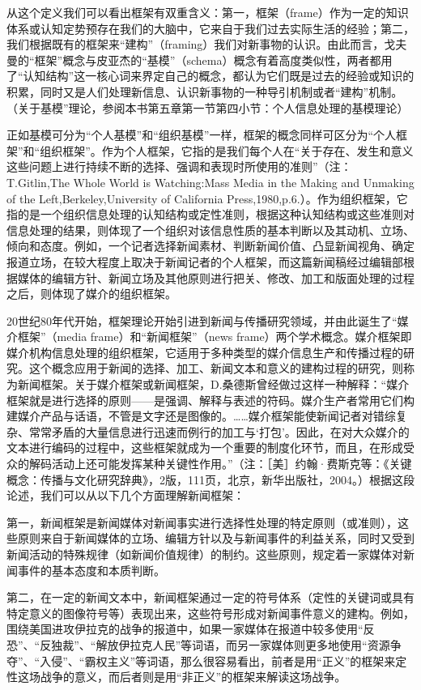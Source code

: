 \documentclass[UTF8,12pt]{ctexart}
\numberwithin{equation}{section} %
\numberwithin{figure}{section}
\numberwithin{table}{section}
\begin{document}
	从这个定义我们可以看出框架有双重含义：第一，框架（frame）作为一定的知识体系或认知定势预存在我们的大脑中，它来自于我们过去实际生活的经验；第二，我们根据既有的框架来“建构”（framing）我们对新事物的认识。由此而言，戈夫曼的“框架”概念与皮亚杰的“基模”（schema）概念有着高度类似性，两者都用了“认知结构”这一核心词来界定自己的概念，都认为它们既是过去的经验或知识的积累，同时又是人们处理新信息、认识新事物的一种导引机制或者“建构”机制。（关于基模”理论，参阅本书第五章第一节第四小节：个人信息处理的基模理论）
	
	正如基模可分为“个人基模”和“组织基模”一样，框架的概念同样可区分为“个人框架”和“组织框架”。作为个人框架，它指的是我们每个人在“关于存在、发生和意义这些问题上进行持续不断的选择、强调和表现时所使用的准则”（注：T.Gitlin,The Whole World is Watching:Mass Media in the Making and Unmaking of the Left,Berkeley,University of California Press,1980,p.6.）。作为组织框架，它指的是一个组织信息处理的认知结构或定性准则，根据这种认知结构或这些准则对信息处理的结果，则体现了一个组织对该信息性质的基本判断以及其动机、立场、倾向和态度。例如，一个记者选择新闻素材、判断新闻价值、凸显新闻视角、确定报道立场，在较大程度上取决于新闻记者的个人框架，而这篇新闻稿经过编辑部根据媒体的编辑方针、新闻立场及其他原则进行把关、修改、加工和版面处理的过程之后，则体现了媒介的组织框架。
	
	20世纪80年代开始，框架理论开始引进到新闻与传播研究领域，并由此诞生了“媒介框架”（media frame）和“新闻框架”（news frame）两个学术概念。媒介框架即媒介机构信息处理的组织框架，它适用于多种类型的媒介信息生产和传播过程的研究。这个概念应用于新闻的选择、加工、新闻文本和意义的建构过程的研究，则称为新闻框架。关于媒介框架或新闻框架，D.桑德斯曾经做过这样一种解释：“媒介框架就是进行选择的原则——是强调、解释与表述的符码。媒介生产者常用它们构建媒介产品与话语，不管是文字还是图像的。……媒介框架能使新闻记者对错综复杂、常常矛盾的大量信息进行迅速而例行的加工与‘打包’。因此，在对大众媒介的文本进行编码的过程中，这些框架就成为一个重要的制度化环节，而且，在形成受众的解码活动上还可能发挥某种关键性作用。”（注：［美］约翰·费斯克等：《关键概念：传播与文化研究辞典》，2版，111页，北京，新华出版社，2004。）根据这段论述，我们可以从以下几个方面理解新闻框架：
	
	第一，新闻框架是新闻媒体对新闻事实进行选择性处理的特定原则（或准则），这些原则来自于新闻媒体的立场、编辑方针以及与新闻事件的利益关系，同时又受到新闻活动的特殊规律（如新闻价值规律）的制约。这些原则，规定着一家媒体对新闻事件的基本态度和本质判断。
	
	第二，在一定的新闻文本中，新闻框架通过一定的符号体系（定性的关键词或具有特定意义的图像符号等）表现出来，这些符号形成对新闻事件意义的建构。例如，围绕美国进攻伊拉克的战争的报道中，如果一家媒体在报道中较多使用“反恐”、“反独裁”、“解放伊拉克人民”等词语，而另一家媒体则更多地使用“资源争夺”、“入侵”、“霸权主义”等词语，那么很容易看出，前者是用“正义”的框架来定性这场战争的意义，而后者则是用“非正义”的框架来解读这场战争。
	
\end{document}
